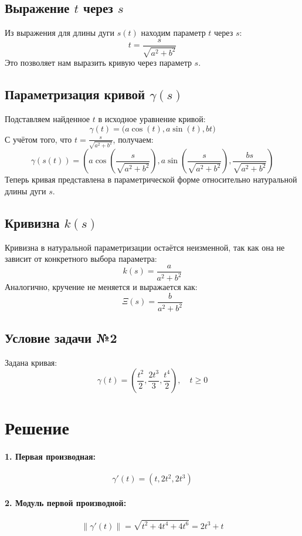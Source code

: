 \documentclass{article}
\begin{document}
        \subsection*{Выражение \(t\) через \(s\)}
        Из выражения для длины дуги \(s(t)\) находим параметр \(t\) через \(s\):
        \[
        t = \frac{s}{\sqrt{a^2 + b^2}}
        \]
        Это позволяет нам выразить кривую через параметр \(s\).
        
        \subsection*{Параметризация кривой \(\gamma(s)\)}
        Подставляем найденное \(t\) в исходное уравнение кривой:
        \[
        \gamma(t) = \big(a \cos(t), a \sin(t), bt\big)
        \]
        С учётом того, что \(t = \frac{s}{\sqrt{a^2 + b^2}}\), получаем:
        \[
        \gamma(s(t)) = \left(
        a \cos\left(\frac{s}{\sqrt{a^2 + b^2}}\right), 
        a \sin\left(\frac{s}{\sqrt{a^2 + b^2}}\right), 
        \frac{b s}{\sqrt{a^2 + b^2}}
        \right)
        \]
        Теперь кривая представлена в параметрической форме относительно натуральной длины дуги \(s\).
        \subsection*{Кривизна \(k(s)\)}
        Кривизна в натуральной параметризации остаётся неизменной, так как она не зависит от конкретного выбора параметра:
        \[
        k(s) = \frac{a}{a^2 + b^2}
        \]
        Аналогично, кручение не меняется и выражается как:
        \[
        \Xi(s) = \frac{b}{a^2 + b^2}
        \]
        \subsection*{Условие задачи №2}
        Задана кривая:
        \[
        \gamma(t) = \left(\frac{t^2}{2}, \frac{2t^3}{3}, \frac{t^4}{2}\right), \quad t \geq 0
        \]
        \section*{Решение}
        \paragraph{1. Первая производная:}
        \[
        \gamma'(t) = \left(t, 2t^2, 2t^3\right)
        \]
        
        \paragraph{2. Модуль первой производной:}
        \[
        \|\gamma'(t)\| = \sqrt{t^2 + 4t^4 + 4t^6} = 2t^3 + t
        \]
\end{document}

